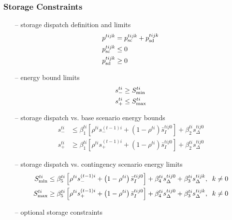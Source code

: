 \documentclass[12pt]{article}
\numberwithin{equation}{section}
\numberwithin{table}{section}
\numberwithin{figure}{section}
\begin{document}
\subsubsection*{Storage Constraints}
\begin{itemize}
\item[--] storage dispatch definition and limits
\begin{align}
p^{tijk} &= p^{tijk}_{\rm sc} + p^{tijk}_{\rm sd} \\
p^{tijk}_{\rm sc} &\leq 0 \\
p^{tijk}_{\rm sd} &\geq 0
\end{align}

\item[--] energy bound limits
\begin{align}
s_-^{ti} &\geq S^{ti}_{\rm min} \\
s^{ti}_+ &\leq S^{ti}_{\rm max}
\end{align}

\item[--] storage dispatch vs. base scenario energy bounds
\begin{align}
s^{ti}_- &\leq \beta_1^{ti} \left[\rho^{ti} s^{(t-1)i}_- + \left(1-\rho^{ti}\right) \bar{s}_I^{tij0}\right] + \beta_2^{ti} s_\Delta^{tij0} \label{eq:storage1st} \\
s^{ti}_+ &\geq \beta_1^{ti} \left[\rho^{ti} s^{(t-1)i}_+ + \left(1-\rho^{ti}\right) \bar{s}_I^{tij0}\right] + \beta_2^{ti} s_\Delta^{tij0}
\end{align}

\item[--] storage dispatch vs. contingency scenario energy limits
\begin{align}
S^{ti}_{\rm min} &\leq \beta_5^{ti} \left[\rho^{ti} s^{(t-1)i}_- + \left(1-\rho^{ti}\right) \bar{s}_I^{tij0}\right] + \beta_4^{ti} s_\Delta^{tij0} + \beta_3^{ti} s_\Delta^{tijk}, \;\; k\neq 0 \\
S^{ti}_{\rm max} &\geq \beta_5^{ti} \left[\rho^{ti} s^{(t-1)i}_+ + \left(1-\rho^{ti}\right) \bar{s}_I^{tij0}\right] + \beta_4^{ti} s_\Delta^{tij0} + \beta_3^{ti} s_\Delta^{tijk}, \;\; k\neq 0
\label{eq:storagecontingencylast}
\end{align}

\item[--] optional storage constraints
\begin{itemize}


\end{itemize}
\end{itemize}
\end{document}
